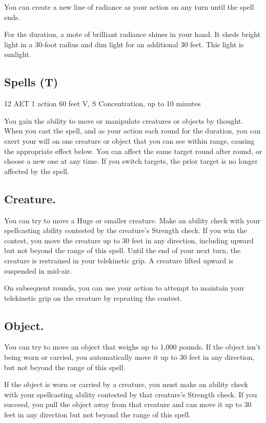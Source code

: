 You can create a new line of radiance as your action on any turn until the spell ends.

For the duration, a mote of brilliant radiance shines in your hand. It sheds bright light in a 30-foot radius and dim light for an additional 30 feet. This light is sunlight.

\subsection{Spells (T)}

{12 AET}
{1 action}
{60 feet}
{V, S}
{Concentration, up to 10 minutes}

You gain the ability to move or manipulate creatures or objects by thought. When you cast the spell, and as your action each round for the duration, you can exert your will on one creature or object that you can see within range, causing the appropriate effect below. You can affect the same target round after round, or choose a new one at any time. If you switch targets, the prior target is no longer affected by the spell.

\subsection*{Creature.} You can try to move a Huge or smaller creature. Make an ability check with your spellcasting ability contested by the creature's Strength check. If you win the contest, you move the creature up to 30 feet in any direction, including upward but not beyond the range of this spell. Until the end of your next turn, the creature is restrained in your telekinetic grip. A creature lifted upward is suspended in mid-air.

On subsequent rounds, you can use your action to attempt to maintain your telekinetic grip on the creature by repeating the contest.

\subsection*{Object.} You can try to move an object that weighs up to 1,000 pounds. If the object isn't being worn or carried, you automatically move it up to 30 feet in any direction, but not beyond the range of this spell.

If the object is worn or carried by a creature, you must make an ability check with your spellcasting ability contested by that creature's Strength check. If you succeed, you pull the object away from that creature and can move it up to 30 feet in any direction but not beyond the range of this spell.

